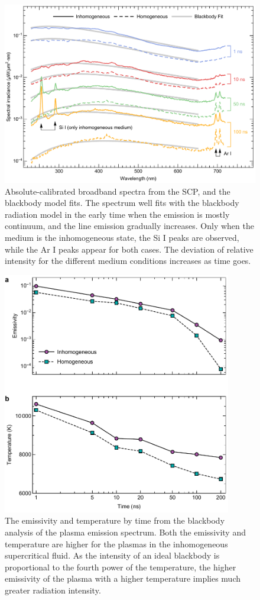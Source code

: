 \begin{figure}[ht!]
\centering
\includegraphics[width=130mm]{figures/ch4/blackbody/fit.pdf}
\caption{Absolute-calibrated broadband spectra from the SCP, and the blackbody model fits. The spectrum well fits with the blackbody radiation model in the early time when the emission is mostly continuum, and the line emission gradually increases. Only when the medium is the inhomogeneous state, the Si I peaks are observed, while the Ar I peaks appear for both cases. The deviation of relative intensity for the different medium conditions increases as time goes.}
\label{fig:blackbodyFit}
\end{figure}

\begin{figure}[ht!]
\centering
\includegraphics[width=100mm]{figures/ch4/blackbody/temporal.pdf}
\caption{The emissivity and temperature by time from the blackbody analysis of the plasma emission spectrum. Both the emissivity and temperature are higher for the plasmas in the inhomogeneous supercritical fluid. As the intensity of an ideal blackbody is proportional to the fourth power of the temperature, the higher emissivity of the plasma with a higher temperature implies much greater radiation intensity.}
\label{fig:blackbodyTemporal}
\end{figure}

